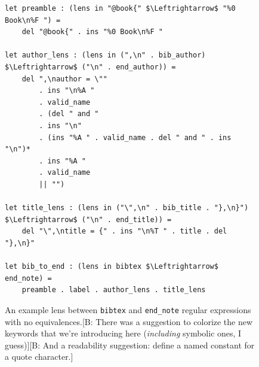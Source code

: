 \documentclass[acmsmall,review,anonymous]{acmart}
\newcommand{\FINISH}[3]{\ifdraft\textcolor{#1}{[#2: #3]}\fi}
\newcommand{\bcp}[1]{\FINISH{dkred}{B}{#1}}
\newcommand{\bibtex}{\textsc{Bib}\TeX{}}
\newcommand{\cd}[1]{\lstinline[backgroundcolor=\color{white}]$#1$}
\begin{document}

\begin{figure}[t]
\begin{lstlisting}
let preamble : (lens in "@book{" $\Leftrightarrow$ "%0 Book\n%F ") =
    del "@book{" . ins "%0 Book\n%F "

let author_lens : (lens in (",\n" . bib_author) $\Leftrightarrow$ ("\n" . end_author)) =
    del ",\nauthor = \""
        . ins "\n%A "
        . valid_name
        . (del " and "
        . ins "\n"
        . (ins "%A " . valid_name . del " and " . ins "\n")* 
        . ins "%A "
        . valid_name
        || "")

let title_lens : (lens in ("\",\n" . bib_title . "},\n}") $\Leftrightarrow$ ("\n" . end_title)) =
    del "\",\ntitle = {" . ins "\n%T " . title . del "},\n}"

let bib_to_end : (lens in bibtex $\Leftrightarrow$ end_note) =
    preamble . label . author_lens . title_lens
\end{lstlisting}
\caption{An example lens between \cd{bibtex} and \cd{end_note} regular
expressions with no equivalences.\bcp{There was
a suggestion to colorize the new keywords that we're introducing here
({\em including} symbolic ones, I guess)}\bcp{And a readability suggestion:
define a named constant for a quote character.}}
\label{fig:example-lens}
\end{figure}

\end{document}
